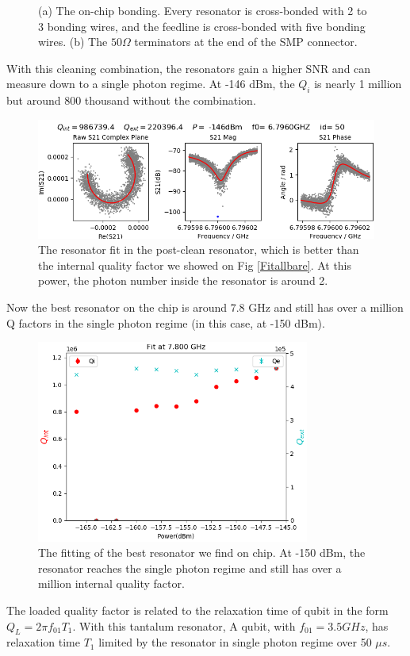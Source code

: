 \begin{figure}[h!]
\begin{subfigure}[b]{0.48\textwidth}
         \caption{}
         \label{Terminator}
     \end{subfigure}
    \caption{(a) The on-chip bonding. Every resonator is cross-bonded with 2 to 3 bonding wires, and the feedline is cross-bonded with five bonding wires. (b) The $50\Omega$ terminators at the end of the SMP connector.}
    \label{TaNWonchip2}
\end{figure}

With this cleaning combination, the resonators gain a higher SNR and can measure down to a single photon regime. At -146 dBm, the $Q_i$ is nearly 1 million but around 800 thousand without the combination.

\begin{figure}[h!]
    \centering
    \includegraphics[width=\textwidth]{Pic/Res_postclean_0.png}
    \caption{The resonator fit in the post-clean resonator, which is better than the internal quality factor we showed on Fig \ref{Fitallbare}. At this power, the photon number inside the resonator is around 2.}
    \label{fig:my_label}
\end{figure}

Now the best resonator on the chip is around 7.8 GHz and still has over a million Q factors in the single photon regime (in this case, at -150 dBm).

\begin{figure}[h!]
    \centering
    \includegraphics[width=0.8\textwidth]{Pic/Res_postclean_1.png}
    \caption{The fitting of the best resonator we find on chip. At -150 dBm, the resonator reaches the single photon regime and still has over a million internal quality factor.}
    \label{fig:my_label}
\end{figure}

The loaded quality factor is related to the relaxation time of qubit in the form $Q_L = 2\pi f_{01}T_1$. With this tantalum resonator, A qubit, with $f_{01} = 3.5GHz$, has relaxation time $T_1$ limited by the resonator in single photon regime over 50 $\mu s$.

